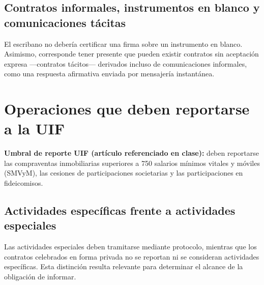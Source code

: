 \documentclass[12pt,oneside]{book}
\begin{document}
\subsection{Contratos informales, instrumentos en blanco y comunicaciones tácitas}

\begin{note}
El escribano no debería certificar una firma sobre un instrumento en blanco. Asimismo, corresponde tener presente que pueden existir contratos sin aceptación expresa —contratos tácitos— derivados incluso de comunicaciones informales, como una respuesta afirmativa enviada por mensajería instantánea.
\end{note}

\section{Operaciones que deben reportarse a la UIF}

\begin{important}
\textbf{Umbral de reporte UIF (artículo referenciado en clase):} deben reportarse las compraventas inmobiliarias superiores a 750 salarios mínimos vitales y móviles (SMVyM), las cesiones de participaciones societarias y las participaciones en fideicomisos.
\end{important}

\subsection{Actividades específicas frente a actividades especiales}

Las actividades especiales deben tramitarse mediante protocolo, mientras que los contratos celebrados en forma privada no se reportan ni se consideran actividades específicas. Esta distinción resulta relevante para determinar el alcance de la obligación de informar.
\end{document}
